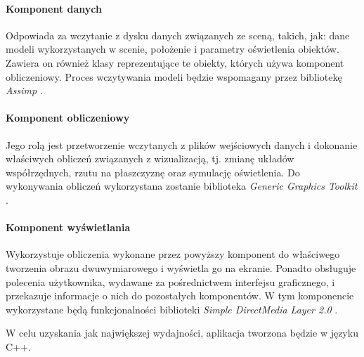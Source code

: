 \documentclass[10pt,a4paper]{article}
\begin{document}
\paragraph{Komponent danych}
Odpowiada za wczytanie z dysku danych związanych ze sceną, takich, jak: dane modeli wykorzystanych w scenie, położenie i parametry oświetlenia obiektów. Zawiera on również klasy reprezentujące te obiekty, których używa komponent obliczeniowy. Proces wczytywania modeli będzie wspomagany przez bibliotekę \emph{Assimp} \cite{assimp}.

\paragraph{Komponent obliczeniowy}
Jego rolą jest przetworzenie wczytanych z plików wejściowych danych i dokonanie właściwych obliczeń związanych z wizualizacją, tj. zmianę układów współrzędnych, rzutu na płaszczyznę oraz symulację oświetlenia. Do wykonywania obliczeń wykorzystana zostanie biblioteka \emph{Generic Graphics Toolkit} \cite{ggt}.

\paragraph{Komponent wyświetlania}
Wykorzystuje obliczenia wykonane przez powyższy komponent do właściwego tworzenia obrazu dwuwymiarowego i wyświetla go na ekranie. Ponadto obsługuje polecenia użytkownika, wydawane za pośrednictwem interfejsu graficznego, i przekazuje informacje o nich do pozostałych komponentów. W tym komponencie wykorzystane będą funkcjonalności biblioteki \emph{Simple DirectMedia Layer 2.0} \cite{sdl}.

W celu uzyskania jak największej wydajności, aplikacja tworzona będzie w języku C++.

\newpage
\end{document}
